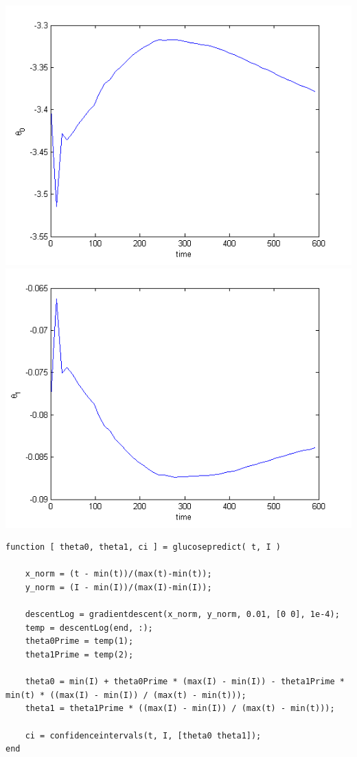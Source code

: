 \documentclass{article}
\begin{document}
\begin{enumerate}
	\includegraphics[width=\linewidth/2]{../images/TvecTheta0} \includegraphics[width=\linewidth/2]{../images/TvecTheta1}\\

\bigskip

\begin{lstlisting}   
function [ theta0, theta1, ci ] = glucosepredict( t, I )
    
    x_norm = (t - min(t))/(max(t)-min(t));
    y_norm = (I - min(I))/(max(I)-min(I));

    descentLog = gradientdescent(x_norm, y_norm, 0.01, [0 0], 1e-4);
    temp = descentLog(end, :);
    theta0Prime = temp(1);
    theta1Prime = temp(2);

    theta0 = min(I) + theta0Prime * (max(I) - min(I)) - theta1Prime * min(t) * ((max(I) - min(I)) / (max(t) - min(t)));
    theta1 = theta1Prime * ((max(I) - min(I)) / (max(t) - min(t)));

    ci = confidenceintervals(t, I, [theta0 theta1]);
end


\end{lstlisting}
\end{enumerate}
\end{document}
